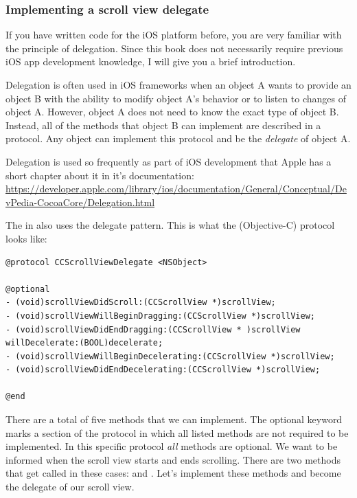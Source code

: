 \subsubsection{Implementing a scroll view delegate}
If you have written code for the iOS platform before, you are very familiar with
the principle of delegation. Since this book does not necessarily require
previous iOS app development knowledge, I will give you a brief introduction.

Delegation is often used in iOS frameworks when an object A wants to provide an
object B with the ability to modify object A's behavior or to listen to changes
of object A. However, object A does not need to know the exact type of object B.
Instead, all of the methods that object B can implement are described in a
protocol. Any object can implement this protocol and be the \textit{delegate} of
object A.

\begin{details}[frametitle={Delegate pattern}]
Delegation is used so frequently as part of iOS development that Apple has a
short chapter about it in it's documentation:
\url{https://developer.apple.com/library/ios/documentation/General/Conceptual/DevPedia-CocoaCore/Delegation.html}
\end{details}

The  in \cocos{} also uses the delegate pattern. This
is what the (Objective-C) protocol looks like:
\begin{lstlisting}
@protocol CCScrollViewDelegate <NSObject>

@optional
- (void)scrollViewDidScroll:(CCScrollView *)scrollView;
- (void)scrollViewWillBeginDragging:(CCScrollView *)scrollView;
- (void)scrollViewDidEndDragging:(CCScrollView * )scrollView willDecelerate:(BOOL)decelerate;
- (void)scrollViewWillBeginDecelerating:(CCScrollView *)scrollView;
- (void)scrollViewDidEndDecelerating:(CCScrollView *)scrollView;

@end
\end{lstlisting}

There are a total of five methods that we can implement. The optional keyword
marks a section of the protocol in which all listed methods are not required to
be implemented. In this specific protocol \textit{all} methods are optional. We
want to be informed when the scroll view starts and ends scrolling. There are
two methods that get called in these cases:
 and
. Let's implement these methods and
become the delegate of our scroll view.

